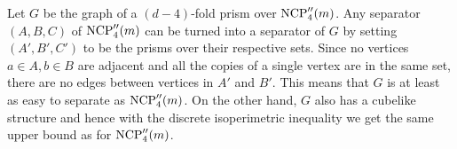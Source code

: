 Let $G$ be the graph of a $(d-4)$-fold prism over $\textrm{NCP}''_4(m)$. Any separator 
$(A,B,C)$ of $\textrm{NCP}''_4(m)$ can be turned into a separator of $G$ by setting 
$(A',B',C')$ to be the prisms over their respective sets. Since no vertices 
$a\in A, b\in B$ are adjacent and all the copies of a single vertex are in the 
same set, there are no edges between vertices in $A'$ and $B'$. This means that 
$G$ is at least as easy to separate as $\textrm{NCP}''_4(m)$. On the other hand, $G$ 
also has a cubelike structure and hence with the discrete isoperimetric 
inequality we get the same upper bound as for $\textrm{NCP}''_4(m)$. 




